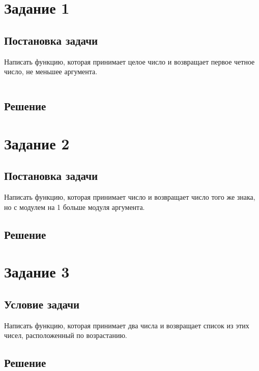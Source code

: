 \section*{Задание 1}
\subsection*{Постановка задачи}

Написать функцию, которая принимает целое число и возвращает первое четное число, не меньшее аргумента.  

\begin{lstlisting}[label=4xd,caption=Решение задания №1, language=lisp]

\end{lstlisting}

\subsection*{Решение}
%

\section*{Задание 2}
\subsection*{Постановка задачи}

Написать функцию, которая принимает число и возвращает число того же знака, но с модулем на 1 больше модуля аргумента.

\subsection*{Решение}
%


\section*{Задание 3}
\subsection*{Условие задачи}
Написать функцию, которая принимает два числа и возвращает список из этих чисел, расположенный по возрастанию.

\subsection*{Решение}
%


